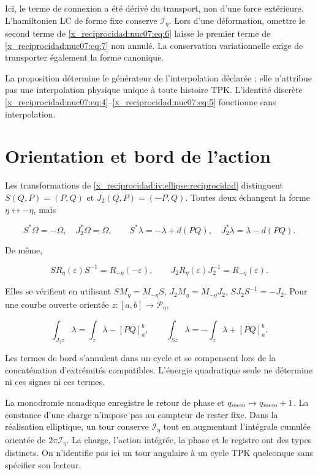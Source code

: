 Ici, le terme de connexion a été dérivé du transport, non d’une force extérieure. L’hamiltonien LC de forme fixe conserve \(\mathcal I_\eta\). Lors d’une déformation, omettre le second terme de \eqref{x_reciprocidad:nuc07:eq:6} laisse le premier terme de \eqref{x_reciprocidad:nuc07:eq:7} non annulé. La conservation variationnelle exige de transporter également la forme canonique.

La proposition détermine le générateur de l’interpolation déclarée ; elle n’attribue pas une interpolation physique unique à toute histoire TPK. L’identité discrète \eqref{x_reciprocidad:nuc07:eq:4}–\eqref{x_reciprocidad:nuc07:eq:5} fonctionne sans interpolation.

\section{Orientation et bord de l’action}

Les transformations de \cref{x_reciprocidad:iv:ellipse:reciprocidad} distinguent \(S(Q,P)=(P,Q)\) et \(J_2(Q,P)=(-P,Q)\). Toutes deux échangent la forme \(\eta\leftrightarrow-\eta\), mais

\begin{equation}
S^*\Omega=-\Omega,\quad J_2^*\Omega=\Omega,\qquad
S^*\lambda=-\lambda+d(PQ),\quad
J_2^*\lambda=\lambda-d(PQ).
\label{x_reciprocidad:nuc07:eq:9}
\end{equation}

De même,

\begin{equation}
S R_\eta(\varepsilon)S^{-1}=R_{-\eta}(-\varepsilon),\qquad
J_2R_\eta(\varepsilon)J_2^{-1}=R_{-\eta}(\varepsilon).
\label{x_reciprocidad:nuc07:eq:10}
\end{equation}

Elles se vérifient en utilisant \(SM_\eta=M_{-\eta}S\), \(J_2M_\eta=M_{-\eta}J_2\), \(SJ_2S^{-1}=-J_2\). Pour une courbe ouverte orientée \(z:[a,b]\to\mathcal P_\eta\),

\begin{equation}
\int_{J_2z}\lambda=\int_z\lambda-[PQ]_a^b,\qquad
\int_{Sz}\lambda=-\int_z\lambda+[PQ]_a^b.
\label{x_reciprocidad:nuc07:eq:11}
\end{equation}

Les termes de bord s’annulent dans un cycle et se compensent lors de la concaténation d’extrémités compatibles. L’énergie quadratique seule ne détermine ni ces signes ni ces termes.

La monodromie nonadique enregistre le retour de phase et \(q_{\rm mem}\mapsto q_{\rm mem}+1\). La constance d’une charge n’impose pas au compteur de rester fixe. Dans la réalisation elliptique, un tour conserve \(\mathcal I_\eta\) tout en augmentant l’intégrale cumulée orientée de \(2\pi\mathcal I_\eta\). La charge, l’action intégrée, la phase et le registre ont des types distincts. On n’identifie pas ici un tour angulaire à un cycle TPK quelconque sans spécifier son lecteur.

